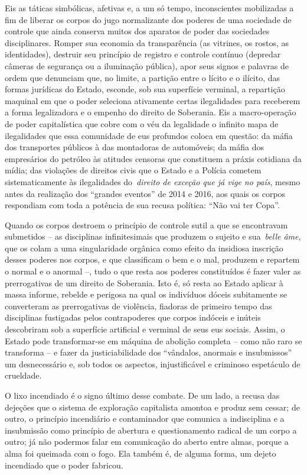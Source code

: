 Eis as táticas simbólicas, afetivas e, a um só tempo, inconscientes
mobilizadas a fim de liberar os corpos do jugo normalizante dos poderes
de uma sociedade de controle que ainda conserva muitos dos aparatos de
poder das sociedades disciplinares. Romper sua economia da transparência
(as vitrines, os rostos, as identidades), destruir seu princípio de
registro e controle contínuo (depredar câmeras de segurança ou a
iluminação pública), apor seus signos e palavras de ordem que denunciam
que, no limite, a partição entre o lícito e o ilícito, das formas
jurídicas do Estado, esconde, sob sua superfície verminal, a repartição
maquinal em que o poder seleciona ativamente certas ilegalidades para
receberem a forma legalizadora e o empenho do direito de Soberania. Eis
a macro-operação de poder capitalística que cobre com o véu da
legalidade o infinito mapa de ilegalidades que essa comunidade de eus
profundos coloca em questão: da máfia dos transportes públicos à das
montadoras de automóveis; da máfia dos empresários do petróleo às
atitudes censoras que constituem a práxis cotidiana da mídia; das
violações de direitos civis que o Estado e a Polícia cometem
sistematicamente às ilegalidades do~\emph{\emph{direito de exceção que
já vige no país}}, mesmo antes da realização dos ``grandes eventos'' de
2014 e 2016, aos quais os corpos respondiam com toda a potência de sua
recusa política: ``Não vai ter Copa''.

Quando os corpos destroem o princípio de controle sutil a que se
encontravam submetidos -- as disciplinas infinitesimais que produzem o
sujeito e sua~\emph{belle âme}, que os colam a uma singularidade
orgânica como efeito da insidiosa inscrição desses poderes nos corpos, e
que classificam o bem e o mal, produzem e repartem o normal e o anormal
--, tudo o que resta aos poderes constituídos é fazer valer as
prerrogativas de um direito de Soberania. Isto é, só resta ao Estado
aplicar à massa informe, rebelde e perigosa na qual os indivíduos dóceis
subitamente se converteram as prerrogativas de violência, fiadoras de
primeiro tempo das disciplinas fustigadas pelos contrapoderes que corpos
indóceis e inúteis descobriram sob a superfície artificial e verminal de
seus eus sociais. Assim, o Estado pode transformar-se em máquina de
abolição completa -- como não raro se transforma -- e fazer da
justiciabilidade dos ``vândalos, anormais e insubmissos'' um
desnecessário e, sob todos os aspectos, injustificável e criminoso
espetáculo de crueldade.

O lixo incendiado é o signo último desse combate. De um lado, a recusa
das dejeções que o sistema de exploração capitalista amontoa e produz
sem cessar; de outro, o princípio incendiário e contaminador que
comunica a indisciplina e a insubmissão como princípio de abertura e
questionamento radical de um corpo a outro; já não podermos falar em
comunicação do aberto entre almas, porque a alma foi queimada com o
fogo. Ela também é, de alguma forma, um dejeto incendiado que o poder
fabricou.

